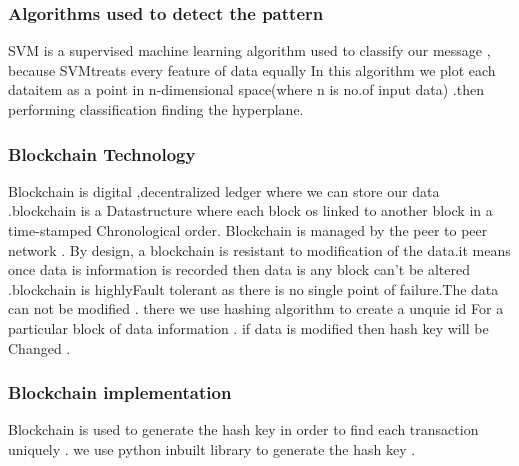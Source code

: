 \subsubsection{Algorithms used to detect the pattern}
SVM is a supervised machine learning algorithm used to classify our message , because SVMtreats every feature of data equally In this algorithm we plot each dataitem as a point in n-dimensional space(where n is no.of input data) .then performing classification finding the hyperplane.\cite{Svm}
\subsubsection{Blockchain Technology}
Blockchain is digital ,decentralized ledger where we can store our data .blockchain is a Datastructure where each block os linked to another block in a time-stamped Chronological order. Blockchain is managed by the peer to peer network . By design, a blockchain is resistant to modification of the data.it means once data is  information is recorded then data is any block can’t be altered .blockchain is highlyFault tolerant as there is no single point  of failure.The data can not be modified . there we use hashing algorithm to create a unquie id For a particular block of data  information . if data is modified then hash key will be Changed .\cite{Blockchain}
\subsubsection{Blockchain implementation}
Blockchain is used to generate the hash key in order to find each transaction uniquely . we use python inbuilt library to generate the hash key .